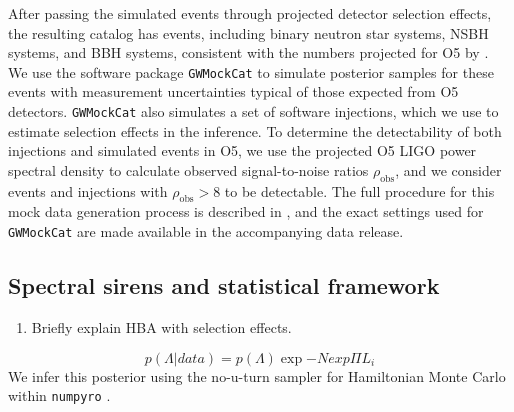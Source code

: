 \documentclass[]{aastex631}
\begin{document}
After passing the simulated events through projected detector selection effects, the resulting catalog has  events, including  binary neutron star systems,  NSBH systems, and  BBH systems, consistent with the numbers projected for O5 by \citet{kiendrebogo_observing_2023}.
We use the software package \texttt{GWMockCat} \citep{farah_things_2023} to simulate posterior samples for these events with measurement uncertainties typical of those expected from O5 detectors.
\texttt{GWMockCat} also simulates a set of software injections, which we use to estimate selection effects in the inference.
To determine the detectability of both injections and simulated events in O5, we use the projected O5 LIGO power spectral density \citep{dcc page} to calculate observed signal-to-noise ratios $\rho_{\text{obs}}$, and we consider events and injections with $\rho_{\text{obs}}>8$ to be detectable. 
The full procedure for this mock data generation process is described in \citet{fishbach_where, farah_things_2023, essick_dagnabbit_2023}, and the exact settings used for \texttt{GWMockCat} are made available in the accompanying data release. 

\subsection{Spectral sirens and statistical framework}
\label{sec:ss}
\begin{enumerate}
    \item Briefly explain HBA with selection effects.
\end{enumerate}
\begin{equation}
    p(\Lambda|data) = p(\Lambda)\exp{-Nexp} \Pi L_i
    \label{eq:inhomog-poisson}
\end{equation}
We infer this posterior using the no-u-turn sampler for Hamiltonian Monte Carlo within \texttt{numpyro} \citep{hoffman_no-u-turn_2011, numpyro}. 
\end{document}
